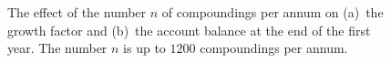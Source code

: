 \documentclass[a4paper,oneside,12pt]{article}
\begin{document}
\begin{problem}
{\begin{solution}
\begin{figure}[!htbp]
\centering
{}
\caption{%
  The effect of the number $n$ of compoundings per annum on (a)~the
  growth factor and (b)~the account balance at the end of the first
  year.  The number $n$ is up to $1200$ compoundings per annum.
}
\label{fig:exponential:e_savings_up_to_1200_compounding}
\end{figure}


\end{solution}}
\end{problem}
\end{document}
